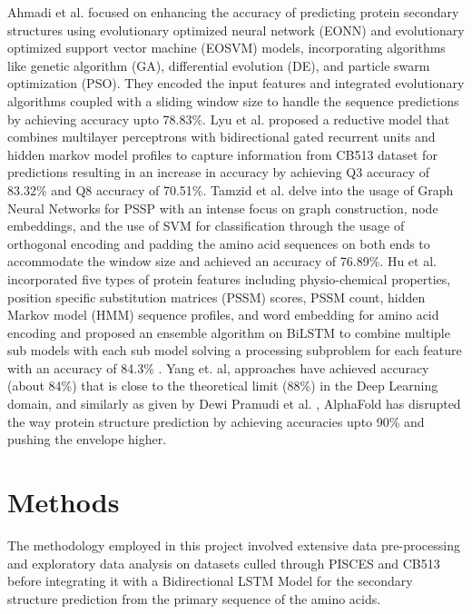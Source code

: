 \documentclass[conference]{IEEEtran}
\begin{document}
Ahmadi et al.\cite{eonn} focused on enhancing the accuracy of predicting protein secondary structures using evolutionary optimized neural network (EONN) and evolutionary optimized support vector machine (EOSVM) models, incorporating algorithms like genetic algorithm (GA), differential evolution (DE), and particle swarm optimization (PSO). They encoded the input features and integrated evolutionary algorithms coupled with a sliding window size to handle the sequence predictions by achieving accuracy upto 78.83\%. Lyu et al. \cite{redmlp} proposed a reductive model that combines multilayer perceptrons with bidirectional gated recurrent units and hidden markov model profiles to capture information from CB513 dataset for predictions resulting in an increase in accuracy by achieving Q3 accuracy of 83.32\% and Q8 accuracy of 70.51\%. Tamzid et al. \cite{gnn} delve into the usage of Graph Neural Networks for PSSP with an intense focus on graph construction, node embeddings, and the use of SVM for classification through the usage of orthogonal encoding and padding the amino acid sequences on both ends to accommodate the window size and achieved an accuracy of 76.89\%. Hu et al. \cite{bils} incorporated five types of protein features including physio-chemical properties, position specific substitution matrices (PSSM) scores, PSSM count, hidden Markov model (HMM) sequence profiles, and word embedding for amino acid encoding and proposed an ensemble algorithm on BiLSTM to combine multiple sub models with each sub model solving a processing subproblem for each feature with an accuracy of 84.3\% .\cite{litrev65} Yang et. al, approaches have achieved accuracy (about 84\%) that is close to the theoretical limit (88\%) in the Deep Learning domain, and similarly as given by Dewi Pramudi et al. \cite{prepro}, AlphaFold has disrupted the way protein structure prediction by achieving accuracies upto 90\% and pushing the envelope higher.

\section{Methods}

The methodology employed in this project involved extensive data pre-processing and exploratory data analysis on datasets culled through PISCES\cite{pisces}\cite{pisces2} and CB513\cite{cb513} before integrating it with a Bidirectional LSTM Model for the secondary structure prediction from the primary sequence of the amino acids.
\end{document}
